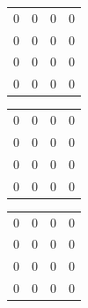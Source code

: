 \documentclass[paper=a4, fontsize=11pt]{article}
\begin{document}
\quad
\begin{tabular}{cccc}
0&0&0&0\\
0&0&0&0\\
0&0&0&0\\
0&0&0&0
\end{tabular}
\quad
\begin{tabular}{cccc}
0&0&0&0\\
0&0&0&0\\
0&0&0&0\\
0&0&0&0
\end{tabular}
\quad
\begin{tabular}{cccc}
0&0&0&0\\
0&0&0&0\\
0&0&0&0\\
0&0&0&0
\end{tabular}


\newpage
\end{document}
